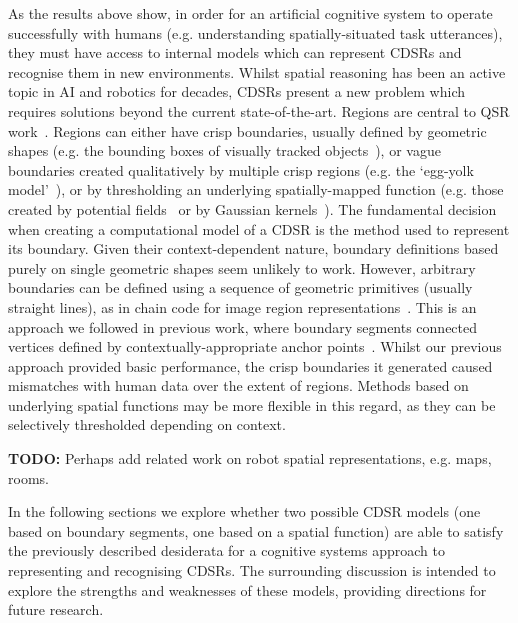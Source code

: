 \documentclass[11pt,letterpaper]{article}
\begin{document}
As the results above show, in order for an artificial cognitive system to operate successfully with humans (e.g. understanding spatially-situated task utterances), they must have access to internal models which can represent CDSRs and recognise them in new environments. Whilst spatial reasoning has been an active topic in AI and robotics for decades, CDSRs present a new problem which requires solutions beyond the current state-of-the-art. Regions are central to QSR work~\cite{Cohn:2001}. Regions can either have crisp boundaries, usually defined by geometric shapes (e.g. the bounding boxes of visually tracked objects~\cite{SridharCohn:10}), or vague boundaries created qualitatively by multiple crisp regions (e.g. the `egg-yolk model'~\cite{Cohn96b}), or by thresholding an underlying spatially-mapped function (e.g. those created by potential fields~\cite{brenneretal07ijcai} or by Gaussian kernels~\cite{burbridge-dearden12}). The fundamental decision when creating a computational model of a CDSR is the method used to represent its boundary. Given their context-dependent nature, boundary definitions based purely on single geometric shapes seem unlikely to work. However, arbitrary boundaries can be defined using a sequence of geometric primitives (usually straight lines), as in chain code for image region representations~\cite{Freeman:1961}. This is an approach we followed in previous work, where boundary segments connected vertices defined by contextually-appropriate anchor points~\cite{Hawes:2012}.  Whilst our previous approach provided basic performance, the crisp boundaries it generated caused mismatches with human data over the extent of regions. Methods based on underlying spatial functions may be more flexible in this regard, as they can be selectively thresholded depending on context. 


\textbf{TODO:} Perhaps add related work on robot spatial representations, e.g. maps, rooms.  

In the following sections we explore whether two possible CDSR models (one based on boundary segments, one based on a spatial function) are able to satisfy the previously described desiderata for a cognitive systems approach to representing and recognising CDSRs. The surrounding discussion is intended to explore the strengths and weaknesses of these models, providing directions for future research.
\end{document}
